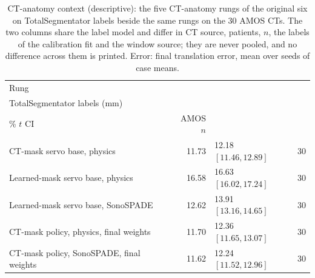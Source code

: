 
\begin{table}[tp]
\renewcommand{\baselinestretch}{1}\scriptsize
\caption{CT-anatomy context (descriptive): the five CT-anatomy rungs of the original six on TotalSegmentator labels beside the same rungs on the 30 AMOS CTs. The two columns share the label model and differ in CT source, patients, $n$, the labels of the calibration fit and the window source; they are never pooled, and no difference across them is printed. Error: final translation error, mean over seeds of case means.}
\label{tab:amos-ctanat}
\centering
\setlength{\tabcolsep}{3pt}
\begin{tabularx}{\textwidth}{@{}>{\raggedright\arraybackslash}X r l c@{}}
\toprule
Rung & \begin{tabular}[b]{@{}r@{}}Original six,\\TotalSegmentator labels (mm)\end{tabular} & \begin{tabular}[b]{@{}l@{}}AMOS (mm),\\95\% $t$ CI\end{tabular} & AMOS $n$ \\
\midrule
\quad CT-mask servo base, physics & 11.73 & 12.18 $[11.46, 12.89]$ & 30 \\
\quad Learned-mask servo base, physics & 16.58 & 16.63 $[16.02, 17.24]$ & 30 \\
\quad Learned-mask servo base, SonoSPADE & 12.62 & 13.91 $[13.16, 14.65]$ & 30 \\
\quad CT-mask policy, physics, final weights & 11.70 & 12.36 $[11.65, 13.07]$ & 30 \\
\quad CT-mask policy, SonoSPADE, final weights & 11.62 & 12.24 $[11.52, 12.96]$ & 30 \\
\bottomrule
\end{tabularx}
\end{table}
